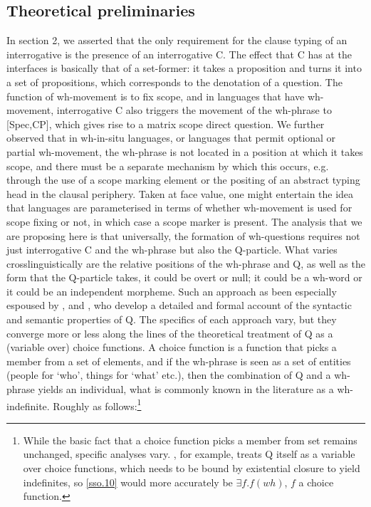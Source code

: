 \documentclass[11pt]{article}
\begin{document}
\subsection{Theoretical preliminaries}
In section 2, we asserted that the only requirement for the clause typing of an interrogative is the presence of an interrogative C. The effect that C has at the interfaces is basically that of a set-former: it takes a proposition and turns it into a set of propositions, which corresponds to the denotation of a question. The function of wh-movement is to fix scope, and in languages that have wh-movement, interrogative C also triggers the movement of the wh-phrase to [Spec,CP], which gives rise to a matrix scope direct question. We further observed that in wh-in-situ languages, or languages that permit optional or partial wh-movement, the wh-phrase is not located in a position at which it takes scope, and there must be a separate mechanism by which this occurs, e.g. through the use of a scope marking element or the positing of an abstract typing head in the clausal periphery. Taken at face value, one might entertain the idea that languages are parameterised in terms of whether wh-movement is used for scope fixing or not, in which case a scope marker is present. The analysis that we are proposing here is that universally, the formation of wh-questions requires not just interrogative C and the wh-phrase but also the Q-particle. What varies crosslinguistically are the relative positions of the wh-phrase and Q, as well as the form that the Q-particle takes, it could be overt or null; it could be a wh-word or it could be an independent morpheme. Such an approach as been especially espoused by \cite{hagstrom:1998}, \cite{cable:2007} and \cite{slade:2011}, who develop a detailed and formal account of the syntactic and semantic properties of Q. The specifics of each approach vary, but they converge more or less along the lines of the theoretical treatment of Q as a (variable over) choice functions. A choice function is a function that picks a member from a set of elements, and if the wh-phrase is seen as a set of entities (people for `who', things for `what' etc.), then the combination of Q and a wh-phrase yields an individual, what is commonly known in the literature as a wh-indefinite. Roughly as follows:\footnote{While the basic fact that a choice function picks a member from set remains unchanged, specific analyses vary. \cite{cable:2007}, for example, treats Q itself as a variable over choice functions, which needs to be bound by existential closure to yield indefinites, so \ref{sso.10} would more accurately be $\exists f.f(wh)$, $f$ a choice function.}
\end{document}

